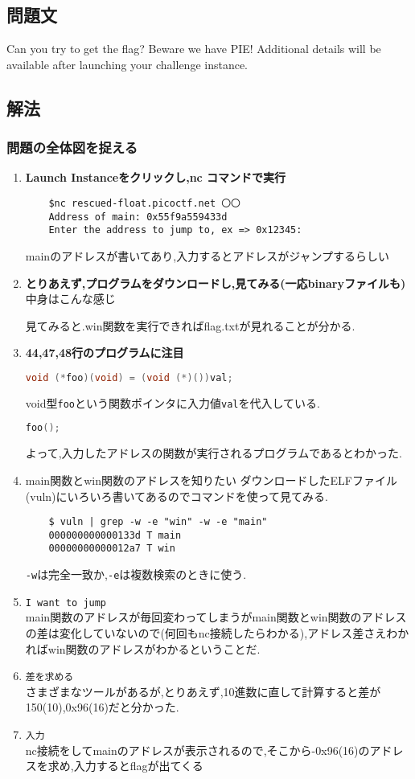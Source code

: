 \documentclass[dvipdfmx]{jsarticle}
\begin{document}
\subsection{問題文}
Can you try to get the flag? Beware we have PIE!
Additional details will be available after launching your challenge instance.
\subsection{解法}
\subsubsection{問題の全体図を捉える}
\begin{enumerate}
	\item \textbf{Launch Instanceをクリックし,nc コマンドで実行}
	\begin{verbatim}
	$nc rescued-float.picoctf.net 〇〇 
	Address of main: 0x55f9a559433d
	Enter the address to jump to, ex => 0x12345: 
	\end{verbatim}
	mainのアドレスが書いてあり,入力するとアドレスがジャンプするらしい
	\item \textbf{とりあえず,プログラムをダウンロードし,見てみる(一応binaryファイルも)}
	中身はこんな感じ
	
	見てみると.win関数を実行できればflag.txtが見れることが分かる.
	\item \textbf{44,47,48行のプログラムに注目}
	\begin{lstlisting}[language=C]
	void (*foo)(void) = (void (*)())val;
	\end{lstlisting}
	void型\texttt{foo}という関数ポインタに入力値\texttt{val}を代入している.
	\begin{lstlisting}[language=C]
	foo();
	\end{lstlisting}
	よって,入力したアドレスの関数が実行されるプログラムであるとわかった.
	\item main関数とwin関数のアドレスを知りたい
	ダウンロードしたELFファイル(vuln)にいろいろ書いてあるのでコマンドを使って見てみる.
	\begin{verbatim}
	$ vuln | grep -w -e "win" -w -e "main"
	000000000000133d T main
	00000000000012a7 T win
	\end{verbatim}
	\texttt{-w}は完全一致か,\texttt{-e}は複数検索のときに使う.
	\item \texttt{I want to jump}\\	
	main関数のアドレスが毎回変わってしまうがmain関数とwin関数のアドレスの差は変化していないので(何回もnc接続したらわかる),アドレス差さえわかればwin関数のアドレスがわかるということだ.
	\item \texttt{差を求める} \\
	さまざまなツールがあるが,とりあえず,10進数に直して計算すると差が150(10),0x96(16)だと分かった.
	\item \texttt{入力}\\
	nc接続をしてmainのアドレスが表示されるので,そこから-0x96(16)のアドレスを求め,入力するとflagが出てくる
\end{enumerate}
\end{document}
